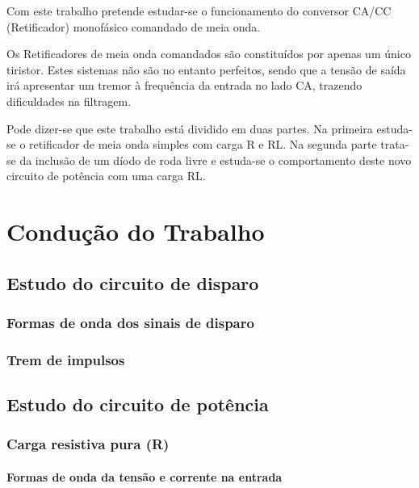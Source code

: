 \documentclass[a4paper,11pt]{article}
\numberwithin{equation}{section}
\begin{document}
Com este trabalho pretende estudar-se o funcionamento do conversor CA/CC (Retificador) monofásico comandado de meia onda.

Os Retificadores de meia onda comandados são constituídos por apenas um único tiristor. Estes sistemas não são no entanto perfeitos, sendo que a tensão de saída irá apresentar um tremor à frequência da entrada no lado CA, trazendo dificuldades na filtragem.

Pode dizer-se que este trabalho está dividido em duas partes. Na primeira estuda-se o retificador de meia onda simples com carga R e RL. Na segunda parte trata-se da inclusão de um díodo de roda livre e estuda-se o comportamento deste novo circuito de potência com uma carga RL. 


\section{Condução do Trabalho}

\subsection{Estudo do circuito de disparo}

\subsubsection{Formas de onda dos sinais de disparo}



\subsubsection{Trem de impulsos}


\subsection{Estudo do circuito de potência}

\subsubsection{Carga resistiva pura (R)}

\paragraph{Formas de onda da tensão e corrente na entrada}
\end{document}
